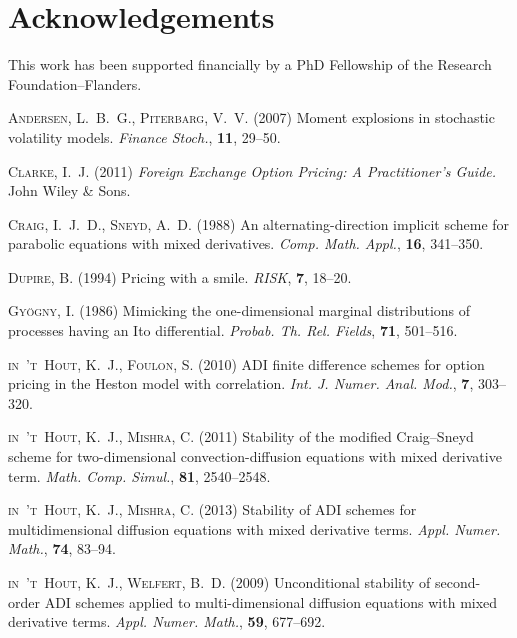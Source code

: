 \documentclass[10pt]{article}
\begin{document}
\section*{Acknowledgements} 
This work has been supported financially by a PhD Fellowship of the Research Foundation--Flanders.


\vfill\eject
\begin{thebibliography}{99}

 \textsc{Andersen, L.~B.~G., Piterbarg, V.~V.} (2007)
Moment explosions in stochastic volatility models.
\textit{Finance Stoch.}, \textbf{11}, 29--50.

 \textsc{Clarke, I.~J.} (2011)
\textit{Foreign Exchange Option Pricing: A Practitioner's Guide.}
John Wiley \& Sons.

 \textsc{Craig, I.~J.~D., Sneyd, A.~D.} (1988)
An alternating-direction implicit scheme for parabolic equations
with mixed derivatives.
\textit{Comp. Math. Appl.}, \textbf{16}, 341--350.

 \textsc{Dupire, B.} (1994)
Pricing with a smile. 
\textit{RISK}, \textbf{7}, 18--20.


 \textsc{Gy\"ogny, I.} (1986)
Mimicking the one-dimensional marginal distributions of processes having an Ito differential.
\textit{Probab. Th. Rel. Fields}, \textbf{71}, 501--516.

 \textsc{in~'t~Hout, K.~J., Foulon, S.} (2010)
ADI finite difference schemes for option pricing in the Heston model
with correlation.
\textit{Int. J. Numer. Anal. Mod.}, \textbf{7}, 303--320.

 \textsc{in~'t~Hout, K.~J., Mishra, C.} (2011)
Stability of the modified Craig--Sneyd scheme for
two-dimensional convection-diffusion equations with mixed
derivative term.
\textit{Math. Comp. Simul.}, \textbf{81}, 2540--2548.

 \textsc{in~'t~Hout, K.~J., Mishra, C.} (2013)
Stability of ADI schemes for multidimensional diffusion equations
with mixed derivative terms.
\textit{Appl. Numer. Math.}, \textbf{74}, 83--94.

 \textsc{in~'t~Hout, K.~J., Welfert, B.~D.} (2009)
Unconditional stability of second-order ADI schemes applied to
multi-dimensional diffusion equations with mixed derivative terms.
\textit{Appl. Numer. Math.}, \textbf{59}, 677--692.


\end{thebibliography}
\end{document}

